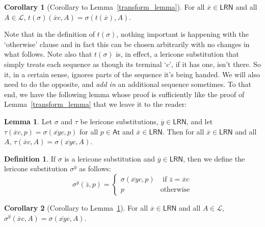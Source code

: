 \documentclass{amsart}
\theoremstyle{definition}
\newtheorem{lemma}{Lemma}
\newtheorem{cor}{Corollary}
\newtheorem{mdef}{Definition}
\newcommand{\LL}{\mathcal{L}}
\newcommand{\At}{\mathsf{At}}
\newcommand{\LRN}{\mathsf{LRN}}
\begin{document}
\begin{cor}[Corollary to Lemma~\ref{transform_lemma}]
    For all $\overline{x}\in\LRN$ and all $A\in\LL$, $t(\sigma)(\overline{x}c,A)=\sigma(t(\overline{x}),A)$.
\end{cor}
\noindent Note that in the definition of $t(\sigma)$, nothing important is happening with the `otherwise' clause and in fact this can be chosen arbitrarily with no changes in what follows. Note also that $t(\sigma)$ is, in effect, a lericone substitution that simply treats each sequence as though its terminal `$c$', if it has one, isn't there. So it, in a certain sense, ignores parts of the sequence it's being handed. We will also need to do the opposite, and \textit{add in} an additional sequence sometimes. To that end, we have the following lemma whose proof is sufficiently like the proof of Lemma~\ref{transform_lemma} that we leave it to the reader:

\begin{lemma}\label{adding}
    Let $\sigma$ and $\tau$ be lericone substitutions, $\overline{y}\in\LRN$, and let $\tau(\overline{x}c,p)=\sigma(\overline{xy}c,p)$ for all $p\in\At$ and $\overline{x}\in\LRN$. Then for all $\overline{x}\in\LRN$ and all $A$, $\tau(\overline{x}c,A)=\sigma(\overline{xy}c,A)$.
\end{lemma}

\begin{mdef}
    If $\sigma$ is a lericone substitution and $\overline{y}\in\LRN$, then we define the lericone substitution $\sigma^{\overline{y}}$ as follows:
    \begin{displaymath}
        \sigma^{\overline{y}}(\overline{z},p) =\left\{
            \begin{array}{lr}
                \sigma(\overline{xy}c,p) & \text{ if }\overline{z}=\overline{x}c \\
                p & \text{otherwise}
            \end{array}\right.
    \end{displaymath}
\end{mdef}

\begin{cor}[Corollary to Lemma~\ref{adding}]
    For all $\overline{x}\in\LRN$ and all $A\in\LL$, $\sigma^{\overline{y}}(\overline{x}c,A)=\sigma(\overline{xy}c,A)$.
\end{cor}
\end{document}
